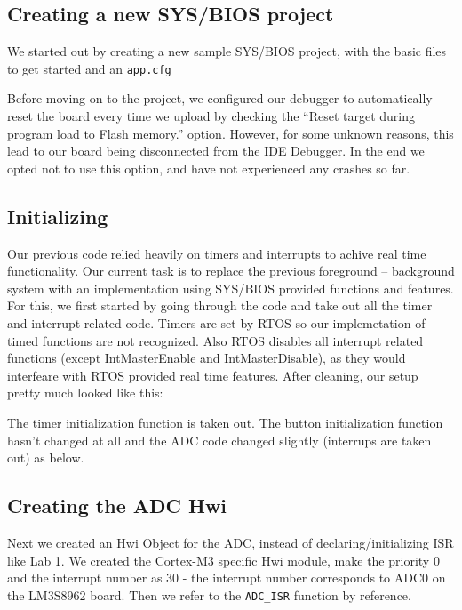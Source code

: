 \documentclass[12pt,oneside,letterpaper]{article}
\begin{document}
\subsection{Creating a new SYS/BIOS project}

We started out by creating a new sample SYS/BIOS project, with the basic files to get started and an \texttt{app.cfg}

Before moving on to the project, we configured our debugger to automatically reset the board every time we upload by checking the “Reset target during program load to Flash memory.” option. However, for some unknown reasons, this lead to our board being disconnected from the IDE Debugger. In the end we opted not to use this option, and have not experienced any crashes so far. 

\subsection{Initializing}
Our previous code relied heavily on timers and interrupts to achive real time functionality. Our current task is to replace the previous foreground – background system with an implementation using SYS/BIOS provided functions and features. For this, we first started by going through the code and take out all the timer and interrupt related code. Timers are set by RTOS so our implemetation of timed functions are not recognized. Also RTOS disables all interrupt related functions (except IntMasterEnable and IntMasterDisable), as they would interfeare with RTOS provided real time features. After cleaning, our setup pretty much looked like this:



The timer initialization function is taken out. The button initialization function hasn’t changed at all and the ADC code changed slightly (interrups are taken out) as below.



\subsection{Creating the ADC Hwi}
Next we created an Hwi Object for the ADC, instead of declaring/initializing ISR like Lab 1. We created the Cortex-M3 specific Hwi module, make the priority 0 and the interrupt number as 30 - the interrupt number corresponds to ADC0 on the LM3S8962 board. Then we refer to the \texttt{ADC\_ISR} function by reference.
\end{document}
